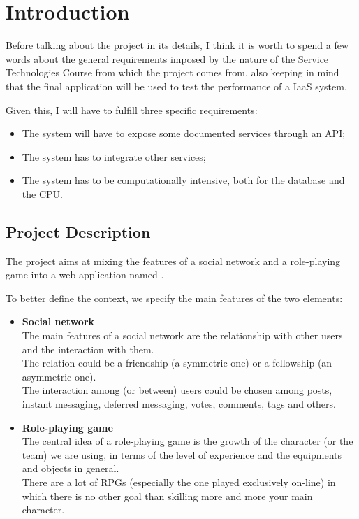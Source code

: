 \chapter{Introduction}
	Before talking about the project in its details, I think it is worth to spend a few words about the general 
	requirements imposed by the nature of the Service Technologies Course from which the project comes from, also keeping in mind that the final application will be used to test the performance of a IaaS system.

	Given this, I will have to fulfill three specific requirements:
	\begin{itemize}
		\item The system will have to expose some documented services through an API;
		\item The system has to integrate other services;
		\item The system has to be computationally intensive, both for the database and the CPU.
	\end{itemize}
	\section{Project Description}
		The project aims at mixing the features of a social network and a role-playing game 
		into a web application named \SocialBattle{}.

		To better define the context, we specify the main features of the two elements:
		\begin{itemize}
			\item \textbf{Social network}\\
			The main features of a social network are
			the relationship with other users and 
			the interaction with them.\\
			The relation could be a friendship (a symmetric one) or a fellowship (an asymmetric one).\\
			The interaction among (or between) users could be chosen among posts, instant messaging, 
			deferred messaging, votes, comments, tags and others.
			\item \textbf{Role-playing game}\\
			The central idea of a role-playing game is the growth of the character (or the team) we 
			are using, in terms of the level of experience and the equipments and objects in general.\\
			There are a lot of RPGs (especially the one played exclusively on-line) in which there is 
			no other goal than skilling more and more your main character.
		\end{itemize}

